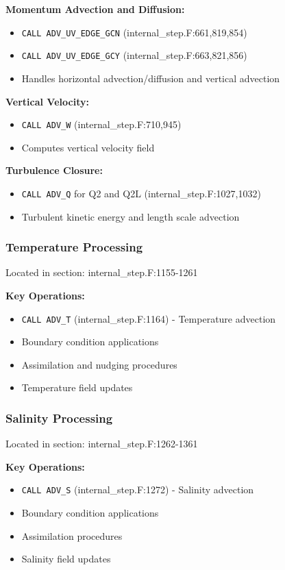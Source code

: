\documentclass[12pt,a4paper]{article}
\begin{document}
\textbf{Momentum Advection and Diffusion:}
\begin{itemize}
    \item \texttt{CALL ADV\_UV\_EDGE\_GCN} (internal\_step.F:661,819,854)
    \item \texttt{CALL ADV\_UV\_EDGE\_GCY} (internal\_step.F:663,821,856)
    \item Handles horizontal advection/diffusion and vertical advection
\end{itemize}

\textbf{Vertical Velocity:}
\begin{itemize}
    \item \texttt{CALL ADV\_W} (internal\_step.F:710,945)
    \item Computes vertical velocity field
\end{itemize}

\textbf{Turbulence Closure:}
\begin{itemize}
    \item \texttt{CALL ADV\_Q} for Q2 and Q2L (internal\_step.F:1027,1032)
    \item Turbulent kinetic energy and length scale advection
\end{itemize}

\subsubsection{Temperature Processing}
Located in section: internal\_step.F:1155-1261

\textbf{Key Operations:}
\begin{itemize}
    \item \texttt{CALL ADV\_T} (internal\_step.F:1164) - Temperature advection
    \item Boundary condition applications
    \item Assimilation and nudging procedures
    \item Temperature field updates
\end{itemize}

\subsubsection{Salinity Processing}
Located in section: internal\_step.F:1262-1361

\textbf{Key Operations:}
\begin{itemize}
    \item \texttt{CALL ADV\_S} (internal\_step.F:1272) - Salinity advection
    \item Boundary condition applications
    \item Assimilation procedures
    \item Salinity field updates
\end{itemize}
\end{document}
